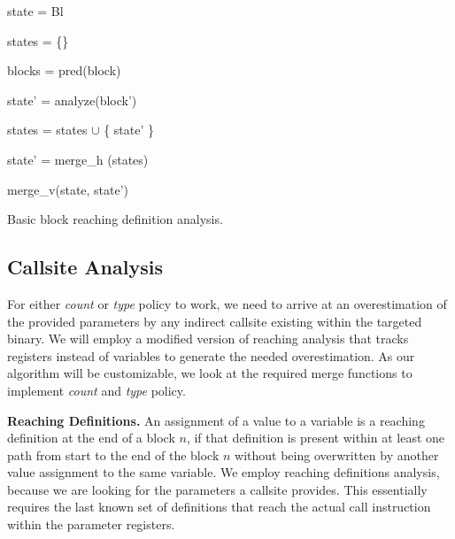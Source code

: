 \begin{algorithm}[!ht]
	\SetAlgoLined
        \BlankLine
	{
 	state = Bl                                   
 	

	states = \{\}                                
	
	blocks = pred(block)                         
	
	 {
	
 		state' = analyze(block')             
 		
		states = states $\cup$ \{ state' \}  
	}

	state' = merge\_h (states)                   

	\Return merge\_v(state, state')              

	}
\caption{Basic block reaching definition analysis.}
\label{alg:reaching}
\end{algorithm}

\subsection{Callsite Analysis}
\label{section:callsiteanalysis}
For either \emph{count} or \emph{type} policy to work, we need to arrive at an overestimation of the provided parameters by any indirect 
callsite existing within the targeted binary. We will employ a modified version of reaching analysis that tracks registers instead of 
variables to generate the needed overestimation. As our algorithm will be customizable, we look at the required merge functions to 
implement \emph{count} and \emph{type} policy. 

\textbf{Reaching Definitions.}
\label{subsection:reachindefinitionstheory}
An assignment of a value to a variable is a reaching definition at the end of a block $n$, if that definition is present within at 
least one path from start to the end of the block $n$ without being overwritten by another value assignment to the same variable. 
We employ reaching definitions analysis, because we are looking for the parameters a callsite provides. This essentially 
requires the last known set of definitions that reach the actual call instruction within the parameter registers.


